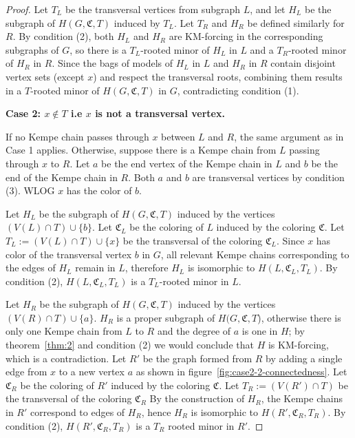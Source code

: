 \begin{proof}
 Let $T_L$ be the transversal vertices from subgraph $L$, and let $H_L$ be the subgraph of $H(G, \mathfrak{C}, T)$ induced by $T_L$.
 Let $T_R$ and $H_R$ be defined similarly for $R$. By condition (2), 
 both $H_L$ and $H_R$ are KM-forcing in the corresponding subgraphs of $G$, 
 so there is a $T_L$-rooted minor of $H_L$ in $L$ and a $T_R$-rooted minor of $H_R$ in $R$. 
 Since the bags of models of $H_L$ in $L$ and $H_R$ in $R$ contain disjoint vertex sets (except $x$) and respect the transversal roots, 
 combining them results in a $T$-rooted minor of $H(G, \mathfrak{C}, T)$ in $G$, contradicting condition (1).
   

\textbf{Case 2: $x \not\in T$ i.e $x$ is not a transversal vertex.}
   
 If no Kempe chain passes through $x$ between $L$ and $R$, the same argument as in Case 1 applies.
 Otherwise, suppose there is a Kempe chain from $L$ passing through $x$ to $R$. 
 Let $a$ be the end vertex of the Kempe chain in $L$ and $b$ be the end of the Kempe chain in $R$. Both $a$ and $b$ are transversal vertices by condition (3).
 WLOG $x$ has the color of $b$.

 Let $H_L$ be the subgraph of $H(G, \mathfrak{C}, T)$ induced by the vertices $(V(L) \cap T) \cup \{b\}$. Let $\mathfrak{C}_L$ be the coloring of $L$ induced by the coloring $\mathfrak{C}$.
 Let $T_L := (V(L) \cap T) \cup \{x\}$ be the transversal of the coloring $\mathfrak{C}_L$. Since $x$ has color of the transversal vertex $b$ in $G$, all relevant Kempe chains corresponding to the 
 edges of $H_L$ remain in $L$, therefore $H_L$ is isomorphic to $H(L, \mathfrak{C}_L, T_L)$. By condition (2), $H(L, \mathfrak{C}_L, T_L)$ is a $T_L$-rooted minor in $L$.
   
 Let $H_R$ be the subgraph of $H(G, \mathfrak{C}, T)$ induced by the vertices $(V(R) \cap T) \cup \{a\}$. $H_R$ is a proper subgraph of $H(G, \mathfrak{C}, T$),
otherwise there is only one Kempe chain from $L$ to $R$ and the degree of $a$ is one in $H$; by theorem~\ref{thm:2} and condition (2) we would conclude that $H$ is KM-forcing, which is a contradiction. 
 Let $R'$ be the graph formed from $R$ by adding a single edge from $x$ to a new vertex $a$ as shown in figure~\ref{fig:case2-2-connectedness}. 
 Let $\mathfrak{C}_R$ be the coloring of $R'$ induced by the coloring $\mathfrak{C}$. Let $T_R := (V(R') \cap T)$ be the transversal of the coloring $\mathfrak{C}_R$
 By the construction of $H_R$, the Kempe chains in $R'$ correspond to edges of $H_R$, hence $H_R$ is isomorphic to $H(R', \mathfrak{C}_R, T_R)$. 
 By condition (2), $H(R', \mathfrak{C}_R, T_R)$ is a $T_R$ rooted minor in $R'$.
   

\end{proof}
